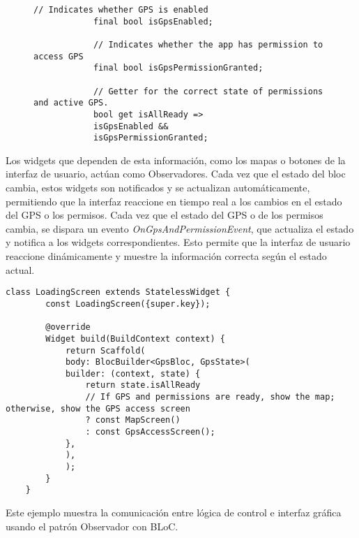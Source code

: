 	\begin{figure}[htbp] %
		\centering
		\begin{lstlisting}[caption={Definición de variables de control en el BLoC}]
			// Indicates whether GPS is enabled
			final bool isGpsEnabled;
			
			// Indicates whether the app has permission to access GPS
			final bool isGpsPermissionGranted;
			
			// Getter for the correct state of permissions and active GPS.
			bool get isAllReady =>
			isGpsEnabled &&
			isGpsPermissionGranted;
		\end{lstlisting}
	\end{figure}
	Los widgets que dependen de esta información, como los mapas o botones de la interfaz de usuario, actúan como Observadores. Cada vez que el estado del \acrshort{bloc} cambia, estos widgets son notificados y se actualizan automáticamente, permitiendo que la interfaz reaccione en tiempo real a los cambios en el estado del GPS o los permisos.
	Cada vez que el estado del GPS o de los permisos cambia, se dispara un evento \textit{OnGpsAndPermissionEvent}, que actualiza el estado y notifica a los widgets correspondientes. Esto permite que la interfaz de usuario reaccione dinámicamente y muestre la información correcta según el estado actual.
	
	\begin{lstlisting}[caption={Carga en función del estado}]
	class LoadingScreen extends StatelessWidget {
		const LoadingScreen({super.key});
		
		@override
		Widget build(BuildContext context) {
			return Scaffold(
			body: BlocBuilder<GpsBloc, GpsState>(
			builder: (context, state) {
				return state.isAllReady 
				// If GPS and permissions are ready, show the map; otherwise, show the GPS access screen
				? const MapScreen()
				: const GpsAccessScreen();
			},
			),
			);
		}
	}
	\end{lstlisting}	
	Este ejemplo muestra la comunicación entre lógica de control e interfaz gráfica usando el patrón Observador con BLoC.
	
